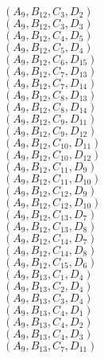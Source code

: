 \documentclass[14pt]{article}
\begin{document}
    $({A}_{9}, {B}_{12}, {C}_{3}, {D}_{2}) $ \\ 
    $({A}_{9}, {B}_{12}, {C}_{3}, {D}_{3}) $ \\ 
    $({A}_{9}, {B}_{12}, {C}_{4}, {D}_{5}) $ \\ 
    $({A}_{9}, {B}_{12}, {C}_{5}, {D}_{4}) $ \\ 
    $({A}_{9}, {B}_{12}, {C}_{6}, {D}_{15}) $ \\ 
    $({A}_{9}, {B}_{12}, {C}_{7}, {D}_{13}) $ \\ 
    $({A}_{9}, {B}_{12}, {C}_{7}, {D}_{14}) $ \\ 
    $({A}_{9}, {B}_{12}, {C}_{8}, {D}_{13}) $ \\ 
    $({A}_{9}, {B}_{12}, {C}_{8}, {D}_{14}) $ \\ 
    $({A}_{9}, {B}_{12}, {C}_{9}, {D}_{11}) $ \\ 
    $({A}_{9}, {B}_{12}, {C}_{9}, {D}_{12}) $ \\ 
    $({A}_{9}, {B}_{12}, {C}_{10}, {D}_{11}) $ \\ 
    $({A}_{9}, {B}_{12}, {C}_{10}, {D}_{12}) $ \\ 
    $({A}_{9}, {B}_{12}, {C}_{11}, {D}_{9}) $ \\ 
    $({A}_{9}, {B}_{12}, {C}_{11}, {D}_{10}) $ \\ 
    $({A}_{9}, {B}_{12}, {C}_{12}, {D}_{9}) $ \\ 
    $({A}_{9}, {B}_{12}, {C}_{12}, {D}_{10}) $ \\ 
    $({A}_{9}, {B}_{12}, {C}_{13}, {D}_{7}) $ \\ 
    $({A}_{9}, {B}_{12}, {C}_{13}, {D}_{8}) $ \\ 
    $({A}_{9}, {B}_{12}, {C}_{14}, {D}_{7}) $ \\ 
    $({A}_{9}, {B}_{12}, {C}_{14}, {D}_{8}) $ \\ 
    $({A}_{9}, {B}_{12}, {C}_{15}, {D}_{6}) $ \\ 
    $({A}_{9}, {B}_{13}, {C}_{1}, {D}_{4}) $ \\ 
    $({A}_{9}, {B}_{13}, {C}_{2}, {D}_{4}) $ \\ 
    $({A}_{9}, {B}_{13}, {C}_{3}, {D}_{4}) $ \\ 
    $({A}_{9}, {B}_{13}, {C}_{4}, {D}_{1}) $ \\ 
    $({A}_{9}, {B}_{13}, {C}_{4}, {D}_{2}) $ \\ 
    $({A}_{9}, {B}_{13}, {C}_{4}, {D}_{3}) $ \\ 
    $({A}_{9}, {B}_{13}, {C}_{7}, {D}_{11}) $ \\ 
\end{document}
